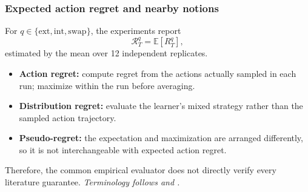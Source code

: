 \begin{frame}[noframenumbering]
  \frametitle{Expected action regret and nearby notions}

  \vspace{0.2cm}
  \footnotesize
  For $q\in\{\mathrm{ext},\mathrm{int},\mathrm{swap}\}$, the experiments report
  \[
    \mathcal R_T^q=\mathbb E[R_T^q],
  \]
  estimated by the mean over 12 independent replicates.

  \vspace{0.2cm}
  \begin{itemize}
    \setlength{\itemsep}{0.12cm}
    \item \textbf{Action regret:} compute regret from the actions actually sampled in each run; maximize within the run before averaging.
    \item \textbf{Distribution regret:} evaluate the learner's mixed strategy rather than the sampled action trajectory.
    \item \textbf{Pseudo-regret:} the expectation and maximization are arranged differently, so it is not interchangeable with expected action regret.
  \end{itemize}

  \vspace{0.2cm}
  {\scriptsize\textcolor{black!60}{
    Therefore, the common empirical evaluator does not directly verify every literature guarantee.
    {\itshape Terminology follows \citet{greenwald_bounds_2006} and \citet{huang_near-optimal_2023}.}
  }}
\end{frame}
